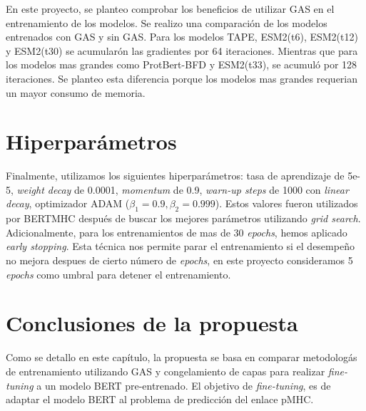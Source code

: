 En este proyecto, se planteo  comprobar los beneficios de utilizar GAS en el entrenamiento de los modelos. Se realizo una comparación de los modelos entrenados con GAS y sin GAS. Para los modelos TAPE, ESM2(t6), ESM2(t12) y ESM2(t30) se acumularón las gradientes por 64 iteraciones. Mientras que para los modelos mas grandes como ProtBert-BFD y ESM2(t33), se acumuló por 128 iteraciones. Se planteo esta diferencia porque los modelos mas grandes requerian un mayor consumo de memoria.


\section{Hiperparámetros}\label{sec:hyperparam}
Finalmente, utilizamos los siguientes hiperparámetros: tasa de aprendizaje de 5e-5, \textit{weight decay} de 0.0001, \textit{momentum} de 0.9, \textit{warn-up steps} de 1000 con \textit{linear decay}, optimizador ADAM ($\beta_1 = 0.9, \beta_2=0.999$). Estos valores fueron utilizados por BERTMHC \citep{cheng2021bertmhc} después de buscar los mejores parámetros utilizando \textit{grid search}. Adicionalmente, para los entrenamientos de mas de 30 \textit{epochs}, hemos aplicado  \textit{early stopping}. Esta técnica nos permite parar el entrenamiento si el desempeño no mejora despues de cierto número de \textit{epochs}, en este proyecto consideramos 5 \textit{epochs} como umbral para detener el entrenamiento.


\section{Conclusiones de la propuesta}

Como se detallo en este capítulo, la propuesta se basa en comparar metodologás de entrenamiento utilizando GAS y congelamiento de capas para realizar \textit{fine-tuning} a un modelo BERT pre-entrenado. El objetivo de \textit{fine-tuning}, es de adaptar el modelo BERT al problema de predicción del enlace pMHC.



